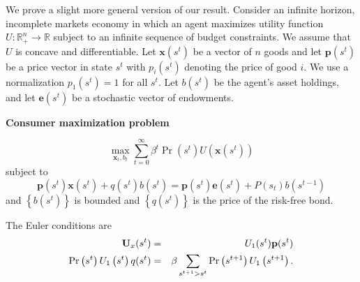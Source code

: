 \documentclass[thmsb,11pt]{article}
\begin{document}
We prove a slight more general version of our result. Consider an infinite
horizon, incomplete markets economy in which an agent maximizes utility
function $U:\mathbb{R}_{+}^{n}\rightarrow \mathbb{R}$ subject to an infinite
sequence of budget constraints. We assume that $U$ is concave and
differentiable. Let $\mathbf{x}(s^t)$ be a vector of $n$ goods and let $%
\mathbf{p}(s^{t})$ be a price vector in state $s^{t}$ with $p_{i}(s^{t})$
denoting the price of good $i.$ We use a normalization $p_{1}\left(
s^{t}\right) =1$ for all $s^{t}.$
Let $b(s^{t})$ be the agent's asset holdings, and let $\mathbf{e}\left(
s^{t}\right) $ be a stochastic vector of endowments.

\textbf{Consumer maximization problem}

\begin{equation}
\max_{\mathbf{x}_{t},b_{t}}\sum_{t=0}^{\infty }\beta ^{t}\Pr \left(
s^{t}\right) U(\mathbf{x}\left( s^{t}\right) )
\label{Tech appendix: consumer maximization}
\end{equation}%
subject to%
\begin{equation}
\label{Tech appendix: budget constraint}
\mathbf{p}\left( s^{t}\right) \mathbf{x}\left( s^{t}\right) +q(s^{t})b\left(
s^{t}\right) =\mathbf{p}\left( s^{t}\right) \mathbf{e}\left( s^{t}\right)
+P(s_t)b\left( s^{t-1}\right)
\end{equation}%
and $\left \{ b\left( s^{t}\right) \right \} $ is bounded and $\left \{
q(s^{t})\right \} $ is the price of the risk-free bond.

The Euler conditions are%
\begin{eqnarray}
\mathbf{U}_{x}(s^{t}) &=&U_{1}(s^{t})\mathbf{p}(s^{t})
\label{Tech appendix: Euler} \\
\Pr \left( s^{t}\right) U_{1}\left( s^{t}\right) q(s^{t}) &=&\beta
\sum_{s^{t+1}>s^{t}}\Pr \left( s^{t+1}\right) U_{1}\left( s^{t+1}\right) .
\notag
\end{eqnarray}
\end{document}
